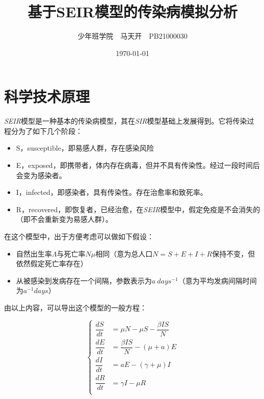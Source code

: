 \documentclass[a4paper]{ltxdoc}
\title{基于SEIR模型的传染病模拟分析}
\author{少年班学院\ \ 马天开\ \ PB21000030}
\date{\today}
\begin{document}
\maketitle
\section{科学技术原理}
\textit{SEIR}模型是一种基本的传染病模型，其在\textit{SIR}模型基础上发展得到。它将传染过程分为了如下几个阶段：

\begin{itemize}
    \item S，susceptible，即易感人群，存在感染风险
    \item E，exposed，即携带者，体内存在病毒，但并不具有传染性。经过一段时间后会变为感染者。
    \item I，infected，即感染者，具有传染性。存在治愈率和致死率。
    \item R，recovered，即恢复者，已经治愈，在\textit{SEIR}模型中，假定免疫是不会消失的（即不会重新变为易感人群）。
\end{itemize}


\begin{figure}[h]
    \centering
\end{figure}

在这个模型中，出于方便考虑可以做如下假设：
\begin{itemize}
    \item 自然出生率$\mathbb \Lambda$与死亡率$N\mu$相同（意为总人口$N = S + E + I + R$保持不变，但依然假定死亡率存在）
    \item 从被感染到发病存在一个间隔，参数表示为$a\ days^{-1}$（意为平均发病间隔时间为$a ^{-1} days$）
\end{itemize}

由以上内容，可以导出这个模型的一般方程：

\begin{equation}
    \left\{
    \begin{aligned}
        \dfrac {dS} {dt} & = \mu N - \mu S - \dfrac {\beta IS }{N} \\
        \dfrac {dE} {dt} & = \dfrac {\beta IS} {N} - (\mu + a)E    \\
        \dfrac {dI} {dt} & = aE -(\gamma + \mu)I                   \\
        \dfrac {dR} {dt} & = \gamma I - \mu R                      \\
    \end{aligned}
    \right.
\end{equation}
\end{document}

